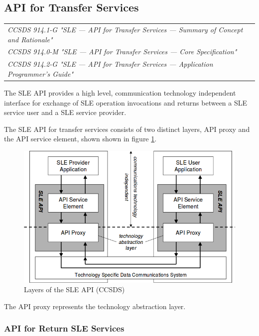 \subsection{API for Transfer Services}

\begin{tabular}{l}
\textit{CCSDS 914.1-G "SLE — API for Transfer Services — Summary of Concept and Rationale" \cite{CCSDS-914.1-G}} \\
\textit{CCSDS 914.0-M "SLE — API for Transfer Services — Core Specification" \cite{CCSDS-914.0-M}} \\
\textit{CCSDS 914.2-G "SLE — API for Transfer Services — Application Programmer's Guide" \cite{CCSDS-914.2-G}} \\
\end{tabular}

The SLE API provides a high level, communication technology independent interface for exchange of SLE operation invocations and returns between a SLE service user and a SLE service provider. 

The SLE API for transfer services consists of two distinct layers, API proxy and the API service element, shown shown in figure \ref{fig:Layers of the SLE API}.

\begin{figure}[h]
\centering\includegraphics[scale=0.5]{fig/layers_of_the_sle_api}
\caption{Layers of the SLE API (CCSDS)}
\label{fig:Layers of the SLE API}
\end{figure}

The API proxy represents the technology abstraction layer. 

\subsubsection{API for Return SLE Services}

